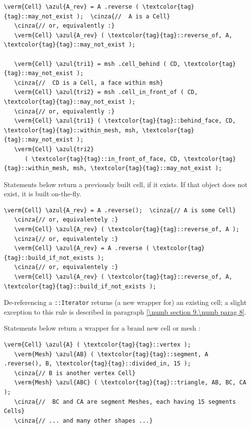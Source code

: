 \begin{Verbatim}[commandchars=\\\{\},formatcom=\small\tt,
   baselinestretch=0.94,framesep=2mm                      ]
   \verm{Cell} \azul{A_rev} = A .reverse ( \textcolor{tag}{tag}::may_not_exist );  \cinza{//  A is a Cell}
   \cinza{// or, equivalently :}
   \verm{Cell} \azul{A_rev} ( \textcolor{tag}{tag}::reverse_of, A, \textcolor{tag}{tag}::may_not_exist );
   
   \verm{Cell} \azul{tri1} = msh .cell_behind ( CD, \textcolor{tag}{tag}::may_not_exist );
   \cinza{//  CD is a Cell, a face within msh}
   \verm{Cell} \azul{tri2} = msh .cell_in_front_of ( CD, \textcolor{tag}{tag}::may_not_exist );
   \cinza{// or, equivalently :}
   \verm{Cell} \azul{tri1} ( \textcolor{tag}{tag}::behind_face, CD, \textcolor{tag}{tag}::within_mesh, msh, \textcolor{tag}{tag}::may_not_exist );
   \verm{Cell} \azul{tri2}
      ( \textcolor{tag}{tag}::in_front_of_face, CD, \textcolor{tag}{tag}::within_mesh, msh, \textcolor{tag}{tag}::may_not_exist );
\end{Verbatim}

Statements below return a previously built cell, if it exists.
If that object does not exist, it is built on-the-fly.

\begin{Verbatim}[commandchars=\\\{\},formatcom=\small\tt,
   baselinestretch=0.94,framesep=2mm                      ]
   \verm{Cell} \azul{A_rev} = A .reverse();  \cinza{// A is some Cell}
   \cinza{// or, equivalentely :}
   \verm{Cell} \azul{A_rev} ( \textcolor{tag}{tag}::reverse_of, A );
   \cinza{// or, equivalentely :}
   \verm{Cell} \azul{A_rev} = A .reverse ( \textcolor{tag}{tag}::build_if_not_exists );
   \cinza{// or, equivalentely :}
   \verm{Cell} \azul{A_rev} ( \textcolor{tag}{tag}::reverse_of, A, \textcolor{tag}{tag}::build_if_not_exists );
\end{Verbatim}

De-referencing a {\small\tt{}::Iterator} returns (a new wrapper for) an existing cell;
a slight exception to this rule is described in paragraph \ref{\numb section 9.\numb parag 8}.

Statements below return a wrapper for a brand new cell or mesh :

\begin{Verbatim}[commandchars=\\\{\},formatcom=\small\tt,
   baselinestretch=0.94,framesep=2mm                      ]
   \verm{Cell} \azul{A} ( \textcolor{tag}{tag}::vertex );
   \verm{Mesh} \azul{AB} ( \textcolor{tag}{tag}::segment, A .reverse(), B, \textcolor{tag}{tag}::divided_in, 15 );
   \cinza{// B is another vertex Cell}
   \verm{Mesh} \azul{ABC} ( \textcolor{tag}{tag}::triangle, AB, BC, CA );
   \cinza{//  BC and CA are segment Meshes, each having 15 segments Cells}
   \cinza{// ... and many other shapes ...}
\end{Verbatim}



